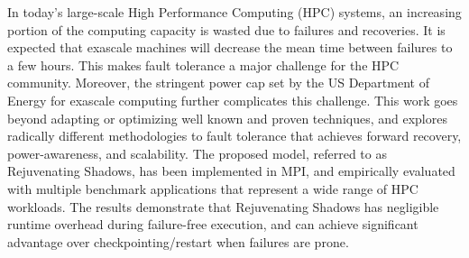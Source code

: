 In today's large-scale High Performance Computing (HPC) systems, an increasing portion of the computing capacity is wasted due to failures and recoveries. It is expected that exascale machines will decrease the mean time between failures to a few hours. This makes fault tolerance a major challenge for the HPC community. Moreover, the stringent power cap set by the US Department of Energy for exascale computing further complicates this challenge. This work goes beyond adapting or optimizing well known and proven techniques, and explores radically different methodologies to fault tolerance that achieves forward recovery, power-awareness, and scalability. The proposed model, referred to as Rejuvenating Shadows, has been implemented in MPI, and empirically evaluated with multiple benchmark applications that represent a wide range of HPC workloads. The results demonstrate that Rejuvenating Shadows has negligible runtime overhead during failure-free execution, and can achieve significant advantage over checkpointing/restart when failures are prone.


